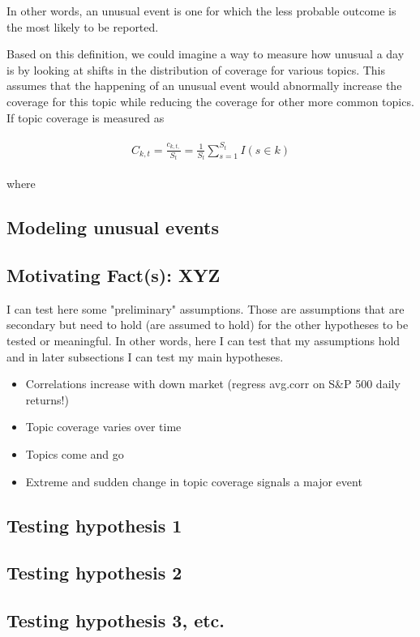 \noindent In other words, an unusual event is one for which the less probable outcome is the most likely to be reported.

Based on this definition, we could imagine a way to measure how unusual a day is by looking at shifts in the distribution of coverage for various topics.
This assumes that the happening of an unusual event would abnormally increase the coverage for this topic while reducing the coverage for other more common topics.
If topic coverage is measured as 

\begin{align}
\begin{split}
C_{k,t} = \frac{c_{k,t,}}{S_t}= \frac{1}{S_t} \sum_{s=1}^{S_t} I(s \in k)
\end{split}
\end{align}

\noindent where 

\subsection{Modeling unusual events}






\subsection{Motivating Fact(s): XYZ}
I can test here some "preliminary" assumptions. Those are assumptions that are secondary but need to hold (are assumed to hold) for the other hypotheses to be tested or meaningful.
In other words, here I can test that my assumptions hold and in later subsections I can test my main hypotheses.

\begin{itemize}
    \item Correlations increase with down market (regress avg.corr on S\&P 500 daily returns!)
    \item Topic coverage varies over time
    \item Topics come and go
    \item Extreme and sudden change in topic coverage signals a major event
\end{itemize}

\subsection{Testing hypothesis 1}


\subsection{Testing hypothesis 2}
\subsection{Testing hypothesis 3, etc.}